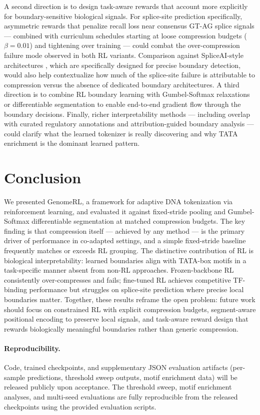 \documentclass[sigconf,screen]{acmart}
\newcommand{\method}{GenomeRL\xspace}
\begin{document}
A second direction is to design task-aware rewards that account more explicitly for boundary-sensitive biological signals. For splice-site prediction specifically, asymmetric rewards that penalize recall loss near consensus GT-AG splice signals — combined with curriculum schedules starting at loose compression budgets ($\beta=0.01$) and tightening over training — could combat the over-compression failure mode observed in both RL variants. Comparison against SpliceAI-style architectures \cite{jaganathan2019predicting}, which are specifically designed for precise boundary detection, would also help contextualize how much of the splice-site failure is attributable to compression versus the absence of dedicated boundary architectures. A third direction is to combine RL boundary learning with Gumbel-Softmax relaxations or differentiable segmentation to enable end-to-end gradient flow through the boundary decisions. Finally, richer interpretability methods — including overlap with curated regulatory annotations and attribution-guided boundary analysis — could clarify what the learned tokenizer is really discovering and why TATA enrichment is the dominant learned pattern.

\section{Conclusion}
We presented \method, a framework for adaptive DNA tokenization via reinforcement learning, and evaluated it against fixed-stride pooling and Gumbel-Softmax differentiable segmentation at matched compression budgets. The key finding is that compression itself — achieved by any method — is the primary driver of performance in co-adapted settings, and a simple fixed-stride baseline frequently matches or exceeds RL grouping. The distinctive contribution of RL is biological interpretability: learned boundaries align with TATA-box motifs in a task-specific manner absent from non-RL approaches. Frozen-backbone RL consistently over-compresses and fails; fine-tuned RL achieves competitive TF-binding performance but struggles on splice-site prediction where precise local boundaries matter. Together, these results reframe the open problem: future work should focus on constrained RL with explicit compression budgets, segment-aware positional encoding to preserve local signals, and task-aware reward design that rewards biologically meaningful boundaries rather than generic compression.

\paragraph{Reproducibility.} Code, trained checkpoints, and supplementary JSON evaluation artifacts (per-sample predictions, threshold sweep outputs, motif enrichment data) will be released publicly upon acceptance. The threshold sweep, motif enrichment analyses, and multi-seed evaluations are fully reproducible from the released checkpoints using the provided evaluation scripts.
\end{document}
